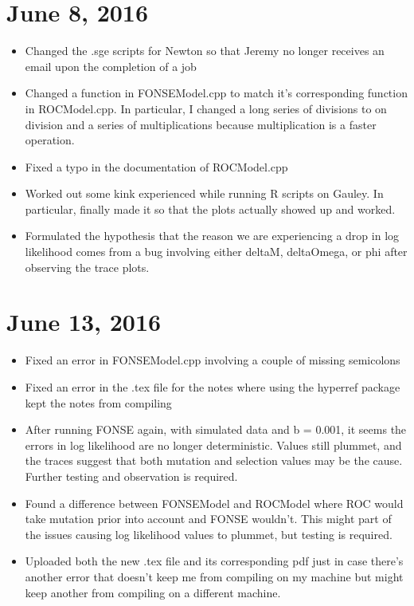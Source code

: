\documentclass[12pt]{labbook}
\begin{document}
\section{June 8, 2016}

\begin{itemize}
    \item Changed the .sge scripts for Newton so that Jeremy no longer receives an email upon the completion of a job
    \item Changed a function in FONSEModel.cpp to match it's corresponding function in ROCModel.cpp. In particular, I changed a long series of divisions to on division and a series of multiplications because multiplication is a faster operation.
    \item Fixed a typo in the documentation of ROCModel.cpp
    \item Worked out some kink experienced while running R scripts on Gauley. In particular, finally made it so that the plots actually showed up and worked.
    \item Formulated the hypothesis that the reason we are experiencing a drop in log likelihood comes from a bug involving either deltaM, deltaOmega, or phi after observing the trace plots.
\end{itemize}

\section{June 13, 2016}

\begin{itemize}
    \item Fixed an error in FONSEModel.cpp involving a couple of missing semicolons
    \item Fixed an error in the .tex file for the notes where using the hyperref package kept the notes from compiling
    \item After running FONSE again, with simulated data and b = 0.001, it seems the errors in log likelihood are no longer deterministic. Values still plummet, and the traces suggest that both mutation and selection values may be the cause. Further testing and observation is required.
    \item Found a difference between FONSEModel and ROCModel where ROC would take mutation prior into account and FONSE wouldn't. This might part of the issues causing log likelihood values to plummet, but testing is required.
    \item Uploaded both the new .tex file and its corresponding pdf just in case there's another error that doesn't keep me from compiling on my machine but might keep another from compiling on a different machine.
\end{itemize}
\end{document}
